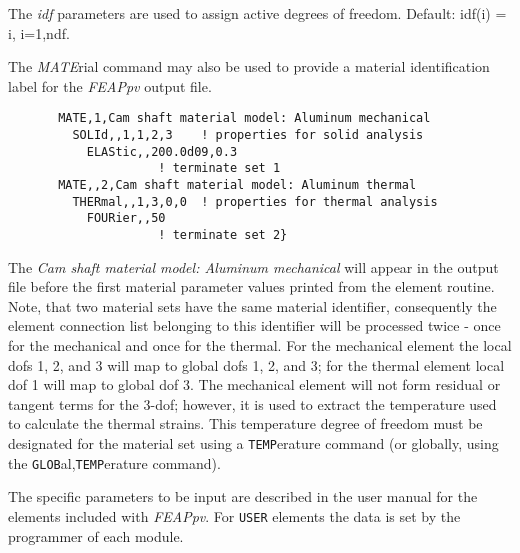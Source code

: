 The {\it idf} parameters are used to assign active degrees of
freedom.  Default: idf(i) = i, i=1,ndf.

The {\it MATE}rial command may also be used to provide a material
identification label for the {\sl FEAPpv} output file.
\pagebreak


\begin{verbatim}
       MATE,1,Cam shaft material model: Aluminum mechanical
         SOLId,,1,1,2,3    ! properties for solid analysis
           ELAStic,,200.0d09,0.3
                     ! terminate set 1
       MATE,,2,Cam shaft material model: Aluminum thermal
         THERmal,,1,3,0,0  ! properties for thermal analysis
           FOURier,,50
                     ! terminate set 2}
\end{verbatim}

The {\it Cam shaft material model: Aluminum mechanical}
will appear in the output file before the first
material parameter values printed from the element routine.
Note, that two material sets have the same
material identifier, consequently the element connection
list belonging to this identifier will be processed
twice - once for the mechanical and once for the
thermal.  For the mechanical element the local dofs 1, 2,
and 3 will map to global dofs 1, 2, and 3; for the thermal
element local dof 1 will map to global dof 3.
The mechanical element will not form residual or tangent terms for the 3-dof;
however, it is used to extract the temperature used to calculate the thermal
strains.  This temperature degree of freedom must be designated for the
material set using a {\tt TEMP}erature command (or globally, using the
{\tt GLOB}al,{\tt TEMP}erature command).

The specific parameters to be input are described in the user manual
for the elements included with {\sl FEAPpv}.  For {\tt USER} elements the
data is set by the programmer of each module.
\vfil\eject

